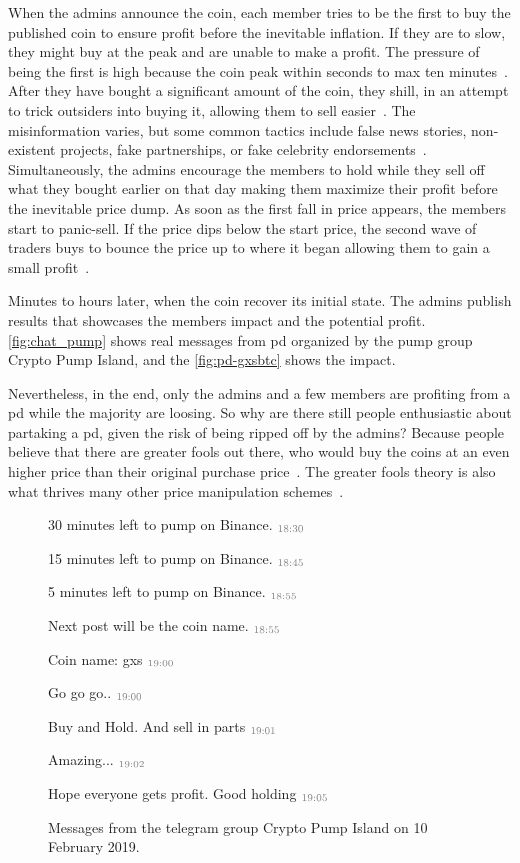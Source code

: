 When the admins announce the coin, each member tries to be the first to buy the published coin to ensure profit before the inevitable inflation. If they are to slow, they might buy at the peak and are unable to make a profit. The pressure of being the first is high because the coin peak within seconds to max ten minutes~\cite{P&D_the_outline, P&D_anatomy}. After they have bought a significant amount of the coin, they shill, in an attempt to trick outsiders into buying it, allowing them to sell easier~\cite{P&D_anatomy}. The misinformation varies, but some common tactics include false news stories, non-existent projects, fake partnerships, or fake celebrity endorsements~\cite{P&D_the_outline}. Simultaneously, the admins encourage the members to hold while they sell off what they bought earlier on that day making them maximize their profit before the inevitable price dump. As soon as the first fall in price appears, the members start to panic-sell. If the price dips below the start price, the second wave of traders buys to bounce the price up to where it began allowing them to gain a small profit~\cite{P&D_anatomy}.

Minutes to hours later, when the coin recover its initial state. The admins publish results that showcases the members impact and the potential profit. \autoref{fig:chat_pump} shows real messages from \ac{pd} organized by the pump group Crypto Pump Island, and the \autoref{fig:pd-gxsbtc} shows the impact.

Nevertheless, in the end, only the admins and a few members are profiting from a \ac{pd} while the majority are loosing. So why are there still people enthusiastic about partaking a \ac{pd}, given the risk of being ripped off by the admins? Because people believe that there are greater fools out there, who would buy the coins at an even higher price than their original purchase price~\cite{P&D_anatomy}. The greater fools theory is also what thrives many other price manipulation schemes~\cite{dissecting}.
\begin{figure}[ht]
    \begin{leftbubbles}
    30 minutes left to pump on Binance. $\color{gray}_{\text{18:30}}$
    
    15 minutes left to pump on Binance. $\color{gray}_{\text{18:45}}$
    
    5 minutes left to pump on Binance. $\color{gray}_{\text{18:55}}$
    
    Next post will be the coin name. $\color{gray}_{\text{18:55}}$
    
    Coin name: gxs $\color{gray}_{\text{19:00}}$
    
    Go go go.. $\color{gray}_{\text{19:00}}$

    Buy and Hold. And sell in parts $\color{gray}_{\text{19:01}}$
    
    Amazing... $\color{gray}_{\text{19:02}}$
    
    Hope everyone gets profit.
    Good holding $\color{gray}_{\text{19:05}}$
    \end{leftbubbles}
    \caption{Messages from the telegram group Crypto Pump Island on 10 February 2019.}
    \label{fig:chat_pump}
\end{figure}

